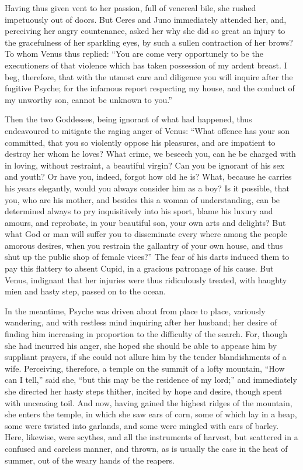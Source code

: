 \documentclass{article}
\begin{document}
Having thus given vent to her passion, full of venereal bile, she rushed
impetuously out of doors. But Ceres and Juno immediately attended her, and,
perceiving her angry countenance, asked her why she did so great an injury to
the gracefulness of her sparkling eyes, by such a sullen contraction of her
brows? To whom Venus thus replied: ``You are come very opportunely to be the
executioners of that violence which has taken possession of my ardent breast. I
beg, therefore, that with the utmost care and diligence you will inquire after
the fugitive Psyche; for the infamous report respecting my house, and the
conduct of my unworthy son, cannot be unknown to you.''

Then the two Goddesses, being ignorant of what had happened, thus endeavoured
to mitigate the raging anger of Venus: ``What offence has your son committed,
that you so violently oppose his pleasures, and are impatient to destroy her
whom he loves? What crime, we beseech you, can he be charged with in loving,
without restraint, a beautiful virgin? Can you be ignorant of his sex and
youth? Or have you, indeed, forgot how old he is? What, because he carries his
years elegantly, would you always consider him as a boy? Is it possible, that
you, who are his mother, and besides this a woman of understanding, can be
determined always to pry inquisitively into his sport, blame his luxury and
amours, and reprobate, in your beautiful son, your own arts and delights? But
what God or man will suffer you to disseminate every where among the people
amorous desires, when you restrain the gallantry of your own house, and thus
shut up the public shop of female vices?'' The fear of his darts induced them
to pay this flattery to absent Cupid, in a gracious patronage of his cause. But
Venus, indignant that her injuries were thus ridiculously treated, with haughty
mien and hasty step, passed on to the ocean.

In the meantime, Psyche was driven about from place to place, variously
wandering, and with restless mind inquiring after her husband; her desire of
finding him increasing in proportion to the difficulty of the search. For,
though she had incurred his anger, she hoped she should be able to appease him
by suppliant prayers, if she could not allure him by the tender blandishments
of a wife. Perceiving, therefore, a temple on the summit of a lofty mountain,
``How can I tell,'' said she, ``but this may be the residence of my lord;'' and
immediately she directed her hasty steps thither, incited by hope and desire,
though spent with unceasing toil. And now, having gained the highest ridges of
the mountain, she enters the temple, in which she saw ears of corn, some of
which lay in a heap, some were twisted into garlands, and some were mingled
with ears of barley. Here, likewise, were scythes, and all the instruments of
harvest, but scattered in a confused and careless manner, and thrown, as is
usually the case in the heat of summer, out of the weary hands of the reapers.
\end{document}
